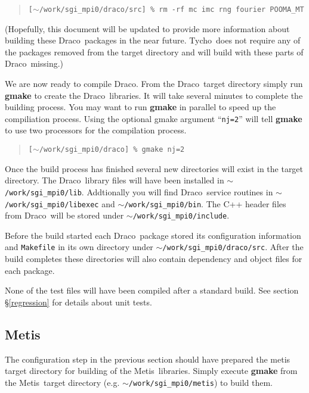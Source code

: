 \documentclass[10pt]{nmemo}
\newcommand{\comp}[1]{\normalfont\normalsize\texttt{#1}}
\newcommand{\draco}{{\normalfont\sffamily Draco}}
\newcommand{\tycho}{{\normalfont\sffamily Tycho}}
\newcommand{\metis}{{\normalfont\sffamily Metis}}
\begin{document}
\footnotesize
\begin{verse}
\texttt{[$\sim$/work/sgi\_mpi0/draco/src] \% rm -rf mc imc rng fourier POOMA\_MT}
\end{verse}
\normalsize

(Hopefully, this document will be updated to provide more information
about building these \draco\ packages in the near future.  \tycho\ 
does not require any of the packages removed from the target directory
and will build with these parts of \draco\ missing.)

We are now ready to compile \draco.  From the \draco\ target directory
simply run \textbf{gmake} to create the \draco\ libraries.  It will
take several minutes to complete the building process.  You may want
to run \textbf{gmake} in parallel to speed up the compiliation
process.  Using the optional gmake argument ``\comp{nj=2}'' will tell 
\textbf{gmake} to use two processors for the compilation process.

\footnotesize
\begin{verse}
\texttt{[$\sim$/work/sgi\_mpi0/draco] \% gmake nj=2}
\end{verse}
\normalsize

Once the build process has finished several new directories will exist 
in the target directory.  The \draco\ library files will have been
installed in \comp{$\sim$/work/sgi\_mpi0/lib}.  Addtionally you will
find \draco\ service routines in \comp{$\sim$/work/sgi\_mpi0/libexec}
and \comp{$\sim$/work/sgi\_mpi0/bin}.  The C++ header files from
\draco\ will be stored under \comp{$\sim$/work/sgi\_mpi0/include}.

Before the build started each \draco\ package stored its configuration
information and \comp{Makefile} in its own directory under
\comp{$\sim$/work/sgi\_mpi0/draco/src}.  After the build completes
these directories will also contain dependency and object files for
each package.

None of the test files will have been compiled after a standard
build.  See section \S\ref{regression} for details about unit tests.

\subsection{\metis}

The configuration step in the previous section should have prepared
the metis target directory for building of the \metis\ libraries.
Simply execute \textbf{gmake} from the \metis\ target directory
(e.g. \comp{$\sim$/work/sgi\_mpi0/metis}) to build them.
\end{document}
